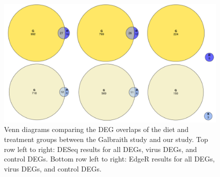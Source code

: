 \documentclass[11pt,a4paper,oldfontcommands,openany]{memoir}
\numberwithin{equation}{section} %
\begin{document}
\begin{figure}[H]
  \includegraphics[width=\textwidth]{Images/GRVenn}
  \caption{Venn diagrams comparing the DEG overlaps of the diet and treatment groups between the Galbraith study and our study. Top row left to right: DESeq results for all DEGs, virus DEGs, and control DEGs. Bottom row left to right: EdgeR results for all DEGs, virus DEGs, and control DEGs.}
  \label{fig:GRVenn}
\end{figure}



\end{document}
